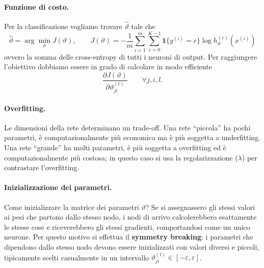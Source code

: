 \paragraph{Funzione di costo.}
Per la classificazione vogliamo trovare $\hat{\vartheta}$ tale che
\[
\hat{\vartheta} = \arg\min_\vartheta J(\vartheta), \qquad J(\vartheta) = -\frac{1}{m}\sum_{i=1}^{m}\sum_{c=0}^{K-1}\mathbf{1}\{y^{(i)} = c\}\log h_\vartheta^{(c)}(x^{(i)})
\]
ovvero la somma delle cross-entropy di tutti i neuroni di output. Per raggiungere l'obiettivo dobbiamo essere in grado di calcolare in modo efficiente
\[
\frac{\partial J(\vartheta)}{\partial \vartheta_{ji}^{(l)}} \qquad \forall j, i, l.
\]

\paragraph{Overfitting.}
Le dimensioni della rete determinano un trade-off. Una rete ``piccola'' ha pochi parametri, è computazionalmente più economica ma è più soggetta a underfitting. Una rete ``grande'' ha molti parametri, è più soggetta a overfitting ed è computazionalmente più costosa; in questo caso si usa la regolarizzazione ($\lambda$) per contrastare l'overfitting.

\paragraph{Inizializzazione dei parametri.}
Come inizializzare la matrice dei parametri $\vartheta$? Se si assegnassero gli stessi valori ai pesi che partono dallo stesso nodo, i nodi di arrivo calcolerebbero esattamente le stesse cose e riceverebbero gli stessi gradienti, comportandosi come un unico neurone. Per questo motivo si effettua il \textbf{symmetry breaking}: i parametri che dipendono dallo stesso nodo devono essere inizializzati con valori diversi e piccoli, tipicamente scelti casualmente in un intervallo $\vartheta_{ji}^{(l)} \in [-\varepsilon, \varepsilon]$.

